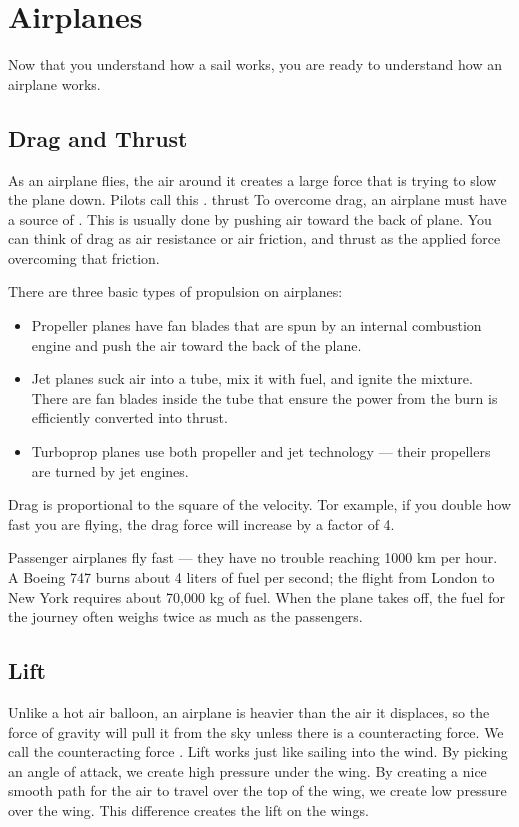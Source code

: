 \chapter{Airplanes}

Now that you understand how a sail works,  you are ready to understand how an airplane works.   

\section{Drag and Thrust}

As an airplane flies, the air around it creates a large force that is trying to slow the 
plane down.  Pilots call this .
{thrust}
To overcome drag, an airplane must have a source of .  This is usually done by pushing air toward the back of plane. You can think of drag as air resistance or air friction, and thrust as the applied force overcoming that friction.

There are three basic types of propulsion on airplanes:

\begin{itemize}
\item Propeller planes have fan blades that are spun by an internal combustion engine and push the air toward the back of the plane.  
\item Jet planes suck air into a tube,  mix it with fuel,  and ignite the mixture.  There are fan blades inside the tube that ensure
the power from the burn is efficiently converted into thrust.
\item Turboprop planes use both propeller and jet technology --- their propellers are turned by jet engines.
\end{itemize}
Drag is proportional to the square of the velocity. Tor example, if you double how fast you are flying, the drag force will increase by a factor of 4. 

Passenger airplanes fly fast --- they have no trouble reaching 1000 km per hour. A Boeing 747 burns about 4 liters of fuel per second; the flight from London to New York requires about 70,000 kg of fuel.  When the plane takes off,  the fuel for the journey often weighs twice as much as the passengers.
 
\section{Lift}

Unlike a hot air balloon, an airplane is heavier than the 
air it displaces, so the force of gravity will pull it from the sky unless there is a counteracting force.  We call the counteracting force .
Lift works just like sailing into the wind. By picking an angle of attack, we create high pressure under the wing.  By creating a nice smooth path for the 
air to travel over the top of the wing,  we create low pressure over the wing.  This difference creates the lift on the wings.

